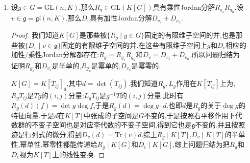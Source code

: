 \begin{enumerate}
\begin{enumerate}[(1)]
\begin{proof}
        	$\varphi$是代数群之间的态射,它是单射是因为$af=\ln(\exp(af))=\sum_{n\ge0}(-1)^{n+1}(\varphi(a)-1)^n/n$是$\varphi(a)$的多项式$P(\varphi(a))$,进而$P(\varphi(a))-a$的某个次幂是零,于是$\varphi(a)$的逆是$\varphi(a)$的某个多项式.最后我们知道幂单变换在乘法下的阶数不能是有限的,于是幂单变换在$\mathrm{GL}(V)$中生成的子群的闭包的维数至少为1(因为零维是有限集合),迫使这个闭包必须等同于1维的闭子群$\varphi(\mathbb{G}_a)$.
        \end{proof}
	\end{enumerate}
	\item 设$g\in G=\mathrm{GL}(n,K)$,那么$R_g\in\mathrm{GL}(K[G])$具有乘性Jordan分解$R_{g_s}R_{g_u}$.设$v\in\mathfrak{g}=\mathfrak{gl}(n,K)$,那么$D_v$具有加性Jordan分解$D_{v_s}+D_{v_n}$.
	\begin{proof}
		
		我们知道$K[G]$是那些被$\{R_g\mid g\in G\}$固定的有限维子空间的并,也是那些被$\{D_v\mid v\in\mathfrak{g}\}$固定的有限维子空间的并.在这些有限维子空间上$g$和$D_v$相应的加性/乘性Jordan分解都存在:$R_g=R_{g_s}R_{g_u}$和$D_v=D_{v_s}+D_{v_n}$.所以问题归结为证明$R_{g_s}$和$D_{v_s}$是半单的,$R_{g_u}$是幂单的,$D_{v_n}$是幂零的.
		
		\qquad
		
		$K[G]=K[T_{ij}]_{d}$,其中$d=\det(T_{ij})$.我们知道$R_g,L_g$作用在$K[T_{ij}]$上为,$R_gT_{ij}$是$Tg$的$(i,j)$分量;$L_gT_{ij}$是$g^{-1}T$的$(i,j)$分量.此时有$R_g(d)(f)=\det g\deg f$,于是$R_g(d)=\deg g\cdot d$,也即$d$是$R_g$的关于$\deg g$的特征向量.于是$d$在$K[T]$中张成的子空间是$G$不变的,于是按照右平移作用下代数群的不变子空间也是对应李代数的不变子空间,得到它也是$\mathfrak{g}$不变的.并且按照迹是行列式的微分,得到$D_v(d)=\mathrm{Tr}(v)d$.综上$R_g\mid K[T]$,$D_v\mid K[T]$的半单性,幂单性,幂零性都能传递给$R_g\mid K[G]$和$D_v\mid K[G]$,综上问题归结为把$R_g$和$D_v$视为$K[T]$上的线性变换.
		
		\qquad
		

\end{proof}
\end{enumerate}
